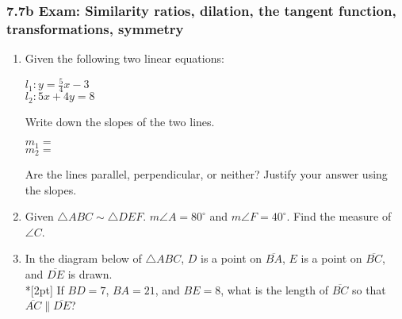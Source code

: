 \documentclass[12pt, twoside]{article}
\begin{document}
\subsubsection*{7.7b Exam: Similarity ratios, dilation, the tangent function, transformations, symmetry}
  \begin{enumerate}

  \item Given the following two linear equations:
    \begin{multicols}{2}
      $l_1: y =\frac{5}{4}x-3$ \\
      $l_2: 5x+4y=8$
    \end{multicols}     \vspace{1cm}
    Write down the slopes of the two lines.
    \begin{multicols}{2}
      $m_1=$ \\
      $m_2=$
    \end{multicols}     \vspace{0.1cm}
    Are the lines parallel, perpendicular, or neither? Justify your answer using the slopes.
    \vspace{2cm}

  \item Given $\triangle ABC \sim \triangle DEF$. $m\angle A = 80^\circ$ and $m\angle F = 40^\circ$. Find the measure of $\angle C$. \vspace{2cm}
  
  \item In the diagram below of $\triangle ABC$, $D$ is a point on $\overline{BA}$, $E$ is a point on $\overline{BC}$, and $\overline{DE}$ is drawn. \\*[2pt] 
    If $BD=7$, $BA=21$, and $BE=8$, what is the length of $\overline{BC}$ so that $\overline{AC} \parallel \overline{DE}$?
    \begin{flushright}
      \end{flushright}


\end{enumerate}
\end{document}
